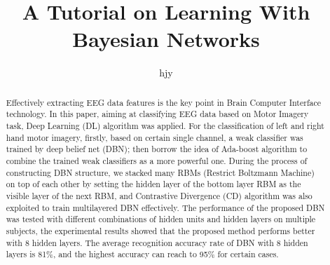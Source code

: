 \documentclass{llncs}
\begin{document}
%
\frontmatter          %
%
\pagestyle{headings}  %
%

%
\mainmatter              %
%
\title{A Tutorial on Learning With Bayesian Networks}
%
%
\author{hjy}
%
%
%
\maketitle              %

\begin{abstract}
Effectively extracting EEG data features is the key point in Brain Computer Interface technology. In this paper, aiming at classifying EEG data based on Motor Imagery task, Deep Learning (DL) algorithm was applied. For the classification of left and right hand motor imagery, firstly, based on certain single channel, a weak classifier was trained by deep belief net (DBN); then borrow the idea of Ada-boost algorithm to combine the trained weak classifiers as a more powerful one. During the process of constructing DBN structure, we stacked many RBMs (Restrict Boltzmann Machine) on top of each other by setting the hidden layer of the bottom layer RBM as the visible layer of the next RBM, and Contrastive Divergence (CD) algorithm was also exploited to train multilayered DBN effectively. The performance of the proposed DBN was tested with different combinations of hidden units and hidden layers on multiple subjects, the experimental results showed that the proposed method performs better with 8 hidden layers. The average recognition accuracy rate of DBN with 8 hidden layers is 81\%, and the highest accuracy can reach to 95\% for certain cases.
\end{abstract}
%
\end{document}

